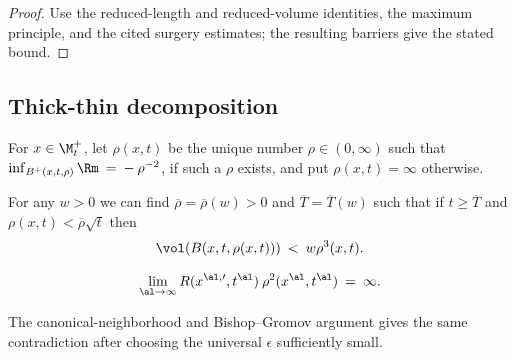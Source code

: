 \begin{proof}
\sketch Use the reduced-length and reduced-volume identities, the maximum principle, and the cited surgery estimates; the resulting barriers give the stated bound.
\end{proof}

\subsection{Thick-thin decomposition}

\begin{definition}
  \label{def:kl-thick-thin-decomposition-curvature-scale}

For $x \in \M_t^+$,
let $\rho(x,t)$ be the unique number $\rho\in (0,\infty)$ such that
$\inf_{B^+(x,t, \rho)} \Rm \: = \: - \: \rho^{-2}$, if such a $\rho$ exists,
and put $\rho(x,t)=\infty$ otherwise.
\end{definition}

\begin{lemma}
  \label{lem:kl-thick-thin-decomposition-thick-thin-geometry-lemma}
 \label{bigenough}
For any $w > 0$ we can find $\overline{\rho} = \overline{\rho}(w) > 0$
and $\overline{T}=\overline{T}(w)$
such that if $t\geq \overline{T}$ and $\rho(x,t) < \overline{\rho} \sqrt{t}$ then
\begin{equation}
\vol(B(x,t,\rho(x,t))) \: < \: w \rho^3(x,t).
\end{equation}
\end{lemma}

\begin{equation} \label{Rblowup}
\lim_{\al \rightarrow \infty}
R(x^{\al,\prime}, t^\al) \: \rho^2(x^\al, t^\al) \: = \: \infty.
\end{equation}

\begin{remark}
\label{rem:kl-thick-thin-decomposition-estimates-canonical-neighborhoods}

The canonical-neighborhood and Bishop--Gromov argument gives the same contradiction after choosing the universal $\epsilon$ sufficiently small.
\end{remark}

